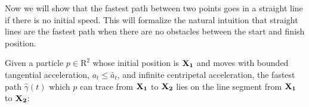 
Now we will show that the fastest path between two points goes in a straight line if there is no initial speed. This will formalize the natural intuition that straight lines are the fastest path when there are no obstacles between the start and finish position.

\begin{theorem}
  Given a particle $p \in \mathrm{R}^2$ whose initial position is $\mathbf{X_1}$ and moves with bounded tangential acceleration, $a_t \le \bar{a}_{t}$, and infinite centripetal acceleration, the fastest path $\hat{\gamma}(t)$ which $p$ can trace from $\mathbf{X_1}$ to $\mathbf{X_2}$ lies on the line segment from $\mathbf{X_1}$ to $\mathbf{X_2}$:
\end{theorem}

